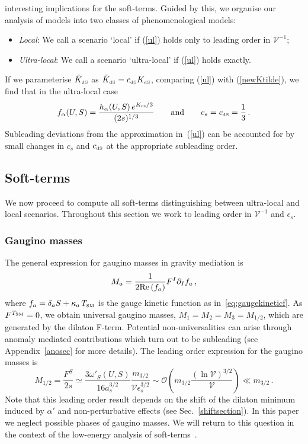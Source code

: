 \documentclass[11pt,a4paper]{article}
\newcommand{\be}{\begin{equation}}
\newcommand{\ee}{\end{equation}}
\def\SM{{\scriptscriptstyle \rm SM}}
\def\dS{{\scriptscriptstyle \rm dS}}
\newcommand\vo{{\mathcal{V}}}
\newcommand{\mc}{\mathcal}
\begin{document}
interesting implications for the soft-terms. Guided by this, we organise our analysis of models into two classes of phenomenological models:
\begin{itemize}
\item {\it Local}: We call a scenario `local' if (\ref{ul}) holds only to leading order in $\vo^{-1}$;
\item {\it Ultra-local}: We call a scenario `ultra-local' if (\ref{ul}) holds exactly.
\end{itemize}
If we parameterise $\tilde{K}_\dS$ as $\tilde{K}_\dS  =  c_\dS K_\dS$,
comparing (\ref{ul}) with (\ref{newKtilde}), we find that in the ultra-local case
\be
f_{\alpha}(U,S) = \frac{h_\alpha(U,S)\,e^{K_{\rm cs}/3}}{(2s)^{1/3}}\qquad \text{and}\qquad c_s=c_\dS=\frac 13\,.
\label{fdef}
\ee
Subleading deviations from the approximation in~(\ref{ul}) can be accounted for by small changes in $c_s$ and $c_\dS$ at the appropriate subleading order.

\subsection{Soft-terms}

We now proceed to compute all soft-terms distinguishing between
ultra-local and local scenarios. Throughout this section we work to
leading order in $\vo^{-1}$ and $\epsilon_s$.

\subsubsection{Gaugino masses}

The general expression for gaugino masses in gravity mediation is
\be
\label{gauginomass}
M_a = \frac{1}{2 {\rm Re}\left(f_a\right)} F^I \partial_I f_a\, ,
\ee
where $f_a=\delta_a S+ \kappa_a \,T_\SM$ is the gauge kinetic function as in~\eqref{eq:gaugekineticf}. As $F^{T_\SM}=0$, we obtain universal gaugino masses,
$M_1=M_2=M_3=M_{1/2}$, which are generated by the dilaton F-term. Potential non-universalities can arise through anomaly mediated contributions which turn out to be subleading (see Appendix~\ref{anosec} for more details).
The leading order expression for the gaugino masses is
\be
M_{1/2} = \frac{F^S}{2 s} \simeq \frac{3 \omega'_S(U,S)}{16 a_s^{3/2}}  \frac{m_{3/2}}{\vo\epsilon_s^{3/2}}
\sim \mc{O}\left(m_{3/2}\frac{\left(\ln\vo\right)^{3/2}}{\vo}\right)\ll m_{3/2}\,.
\label{ggmm}
\ee
Note that this leading order result depends on the shift of the dilaton minimum
induced by $\alpha'$ and non-perturbative effects (see Sec.~\ref{shiftsection}).
In this paper we neglect possible phases of gaugino masses. We will return to this question in the context of the low-energy analysis of soft-terms~\cite{us}.
\end{document}
